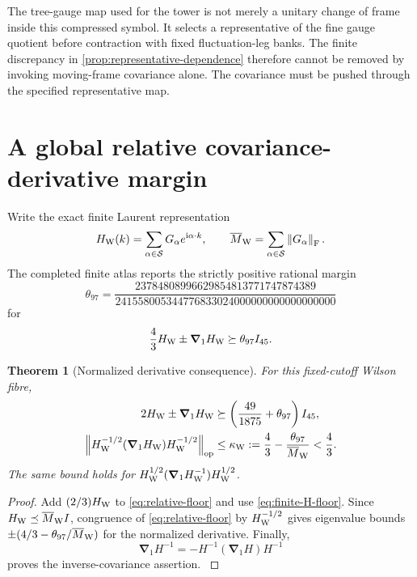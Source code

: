 \documentclass[11pt,oneside,openany]{book}
\newtheorem{theorem}{Theorem}[chapter]
\theoremstyle{definition}
\theoremstyle{remark}
\newcommand{\ii}{\mathrm i}
\newcommand{\op}{\mathrm{op}}
\newcommand{\norm}[1]{\left\lVert#1\right\rVert}
\newcommand{\src}[2]{\cite[#2]{#1}}
\begin{document}
The tree-gauge map used for the tower is not merely a unitary change of
frame inside this compressed symbol. It selects a representative of the
fine gauge quotient before contraction with fixed fluctuation-leg banks.
The finite discrepancy in \cref{prop:representative-dependence} therefore
cannot be removed by invoking moving-frame covariance alone. The
covariance must be pushed through the specified representative map.

\section{A global relative covariance-derivative margin}
Write the exact finite Laurent representation
\[
H_{\rm W}(k)=\sum_{\alpha\in\mathcal S}G_\alpha e^{\ii\alpha\cdot k},
\qquad \overline M_{\rm W}=\sum_{\alpha\in\mathcal S}\norm{G_\alpha}_{\rm F}.
\]
The completed finite atlas reports the strictly positive rational margin
\begin{equation}\label{eq:theta97}
\theta_{97}=
\frac{23784808996629854813771747874389}
{241558005344776833024000000000000000000}
\end{equation}
for
\begin{equation}\label{eq:relative-floor}
\frac43H_{\rm W}\pm\boldsymbol\nabla_1H_{\rm W}\succeq\theta_{97}I_{45}.
\end{equation}

\begin{theorem}[Normalized derivative consequence]\label{thm:covariance-margin}
For this fixed-cutoff Wilson fibre,
\begin{align}
2H_{\rm W}\pm\boldsymbol\nabla_1H_{\rm W}
&\succeq\left(\frac{49}{1875}+\theta_{97}\right)I_{45},\label{eq:H2margin}\\
\norm{H_{\rm W}^{-1/2}(\boldsymbol\nabla_1H_{\rm W})H_{\rm W}^{-1/2}}_{\op}
&\le\kappa_{\rm W}:=\frac43-\frac{\theta_{97}}{\overline M_{\rm W}}<\frac43.
\label{eq:kappaW}
\end{align}
The same bound holds for
$H_{\rm W}^{1/2}(\boldsymbol\nabla_1H_{\rm W}^{-1})H_{\rm W}^{1/2}$.
\end{theorem}
\begin{proof}
Add $(2/3)H_{\rm W}$ to \cref{eq:relative-floor} and use \cref{eq:finite-H-floor}. Since $H_{\rm W}\preceq\overline M_{\rm W}I$, congruence of \cref{eq:relative-floor} by $H_{\rm W}^{-1/2}$ gives eigenvalue bounds $\pm(4/3-\theta_{97}/\overline M_{\rm W})$ for the normalized derivative. Finally,
\[
\boldsymbol\nabla_1H^{-1}=-H^{-1}(\boldsymbol\nabla_1H)H^{-1}
\]
proves the inverse-covariance assertion. \src{F10}{V97, V100}
\end{proof}
\end{document}
